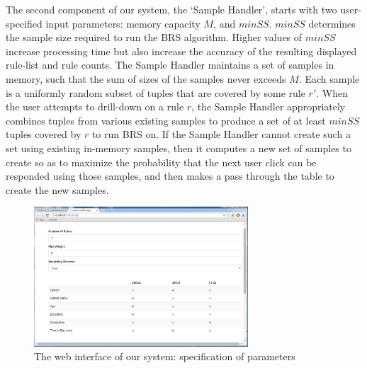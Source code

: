  The second component of our system, the `Sample Handler', starts with two user-specified input parameters: memory capacity $M$, and $minSS$. $minSS$ determines the sample size required to run the BRS algorithm. Higher values of $minSS$ increase processing time but also increase the accuracy of the resulting displayed rule-list and rule counts. The Sample Handler maintains a set of samples in memory, such that the sum of sizes of the samples never exceeds $M$. Each sample is a uniformly random subset of tuples that are covered by some rule $r'$. When the user attempts to drill-down on a rule $r$, the Sample Handler appropriately combines tuples from various existing samples to produce a set of at least $minSS$ tuples covered by $r$ to run BRS on. If the Sample Handler cannot create such a set using existing in-memory samples, then it computes a new set of samples to create so as to maximize the probability that the next user click can be responded using those samples, and then makes a pass through the table to create the new samples. 


\begin{figure}[ht]
\vspace{-5pt}
\centering
\includegraphics[width=80mm,frame]{graphs/uiscreenshot.jpg}
\vspace{-5pt}
\caption{The web interface of our system: specification of parameters \label{fig:interface}}
\vspace{-5pt}
\end{figure}

